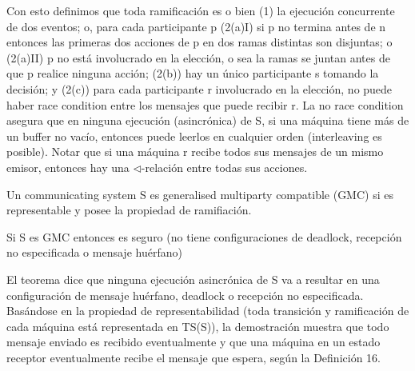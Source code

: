 Con esto definimos que toda ramificación es o bien (1) la ejecución concurrente de dos eventos; o, para cada participante p (2(a)I) si p no termina antes de n entonces las primeras dos acciones de p en dos ramas distintas son disjuntas; o (2(a)II) p no está involucrado en la elección, o sea la ramas se juntan antes de que p realice ninguna acción; (2(b)) hay un único participante s tomando la decisión; y (2(c)) para cada participante r involucrado en la elección, no puede haber race condition entre los mensajes que puede recibir r. La no race condition asegura que en ninguna ejecución (asincrónica) de S, si una máquina tiene más de un buffer no vacío, entonces puede leerlos en cualquier orden (interleaving es posible). Notar que si una máquina r recibe todos sus mensajes de un mismo emisor, entonces hay una $\triangleleft$-relación entre todas sus acciones.

\begin{definition} Un communicating system S es generalised multiparty compatible (GMC) si es representable y posee la propiedad de ramifiación. 
\end{definition}

\begin{theorem}[Solvencia]Si S es GMC entonces es seguro (no tiene configuraciones de deadlock, recepción no especificada o mensaje huérfano)
\end{theorem}

El teorema dice que ninguna ejecución asincrónica de S va a resultar en una configuración de mensaje huérfano, deadlock o recepción no especificada. Basándose en la propiedad de representabilidad (toda transición y ramificación de cada máquina está representada en TS(S)), la demostración \cite{GMC} muestra que todo mensaje enviado es recibido eventualmente y que una máquina en un estado receptor eventualmente recibe el mensaje que espera, según la Definición 16.

